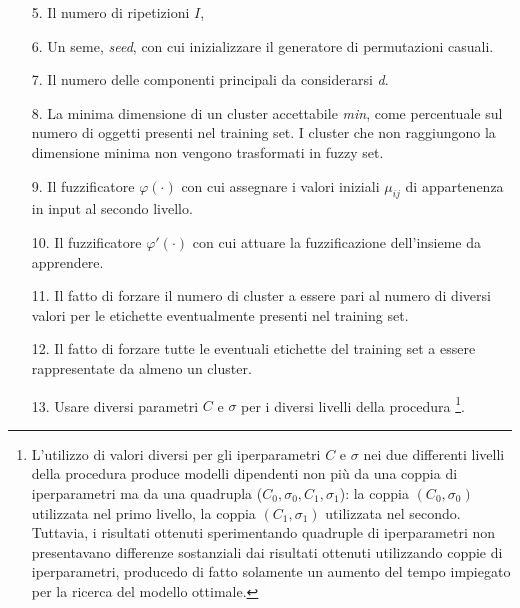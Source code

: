 \documentclass [11pt,a4paper,twoside,openright] {book}
\begin{document}
\begin{enumerate}
\item[5.] Il numero di ripetizioni $I$,
\item[6.] Un seme, \textit{seed}, con cui inizializzare il generatore di permutazioni casuali.
\item[7.] Il numero delle componenti principali da considerarsi \textit{d}.
\item[8.] La minima dimensione di un cluster accettabile \textit{min}, come percentuale sul numero di oggetti presenti nel training set. I cluster che non raggiungono la dimensione minima non vengono trasformati in fuzzy set.
\item[9.] Il fuzzificatore $\varphi(\cdot)$ con cui assegnare i valori iniziali $\mu_{ij}$ di appartenenza in input al secondo livello.
\item[10.] Il fuzzificatore $\varphi'(\cdot)$ con cui attuare la fuzzificazione dell'insieme da apprendere.
\item[11.] Il fatto di forzare il numero di cluster a essere pari al numero di diversi valori per le etichette eventualmente presenti nel training set.
\item[12.] Il fatto di forzare tutte le eventuali etichette del training set a essere rappresentate da almeno un cluster. 
\item[13.] Usare diversi parametri $C$ e $\sigma$ per i diversi livelli della procedura \footnote{L'utilizzo di valori diversi per gli iperparametri $C$ e $\sigma$ nei due differenti livelli della procedura produce modelli dipendenti non più da una coppia di iperparametri ma da una quadrupla ($C_0, \sigma_0, C_1, \sigma_1$): la coppia $(C_0, \sigma_0)$ utilizzata nel primo livello, la coppia $(C_1,\sigma_1)$ utilizzata nel secondo. Tuttavia, i risultati ottenuti sperimentando quadruple di iperparametri non presentavano differenze sostanziali dai risultati ottenuti utilizzando coppie di iperparametri, producedo di fatto solamente un aumento del tempo impiegato per la ricerca del modello ottimale.}.
\end{enumerate}
\end{document}
